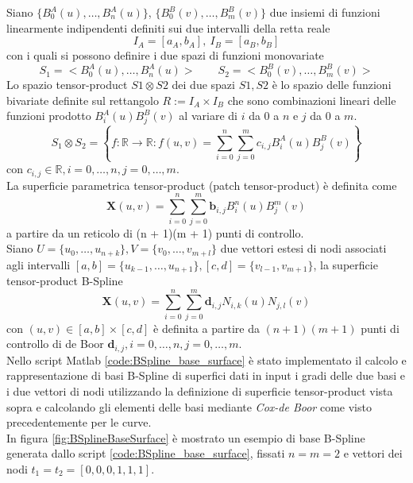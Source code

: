 \documentclass[a4paper, 12pt]{article}
\begin{document}
Siano $\{B^{A}_{0}(u), \dots, B^{A}_{n}(u) \}$, $\{ B^{B}_{0}(v), \dots, B^{B}_{m}(v) \}$
due insiemi di funzioni linearmente indipendenti definiti sui due intervalli della retta reale
$$ I_A = [a_A, b_A],\  I_B = [a_B, b_B]$$
con i quali si possono definire i due spazi di funzioni monovariate
$$S_1 = < B^{A}_{0}(u), \dots, B^{A}_{n}(u) > \qquad S_2 = < B^{B}_{0}(v), \dots, B^{B}_{m}(v) >$$
Lo spazio tensor-product
$S1 \otimes S2$
dei due spazi $S1, S2$ è lo spazio delle funzioni bivariate definite sul rettangolo
$R:= I_A \times I_B$
che sono combinazioni lineari delle funzioni prodotto
$B^{A}_{i}(u) B^{B}_{j}(v)$
al variare di $i$ da $0$ a $n$ e $j$ da $0$ a $m$.
$$S_1 \otimes S_2 = \left\{ f : \mathbb{R} \rightarrow \mathbb{R}: f(u, v) = \sum_{i = 0}^{n}\sum_{j = 0}^{m} c_{i,j}B^A_i(u)B^B_j(v) \right\}$$
con $c_{i,j} \in \mathbb{R}, i=0,\dots, n, j=0,\dots,m$.\\
La superficie parametrica tensor-product (patch tensor-product) è definita come
$$\mathbf{X}(u, v) = \sum_{i = 0}^{n} \sum_{j = 0}^{m} \mathbf{b}_{i, j} B^{n}_{i}(u)B_{j}^{m}(v) $$
a partire da un reticolo di (n + 1)(m + 1) punti di controllo.\\
Siano $U = \{u_0, \dots, u_{n+k}  \}, V = \{ v_0, \dots, v_{m+l}   \}$ due vettori estesi di nodi associati agli intervalli $[a,b] = \{u_{k-1}, \dots, u_{n+1}   \}, [c,d] = \{ v_{l-1}, v_{m+1}\}$, la superficie tensor-product B-Spline $$\mathbf{X}(u, v) = \sum_{i = 0}^{n} \sum_{j = 0}^{m} \mathbf{d}_{i, j} N_{i,k}(u)N_{j,l}(v) $$
con $(u,v) \in [a,b] \times [c,d]$ è definita a partire da $(n+1)(m+1) $ punti di controllo di de Boor $\mathbf{d}_{i,j}, i=0,\dots, n, j=0, \dots, m$.\\
Nello script Matlab \ref{code:BSpline_base_surface} è stato implementato il calcolo e rappresentazione di basi B-Spline di superfici dati in input i gradi delle due basi e i due vettori di nodi utilizzando la definizione di superficie tensor-product vista sopra e calcolando gli elementi delle basi mediante \textit{Cox-de Boor} come visto precedentemente per le curve.\\
In figura \ref{fig:BSplineBaseSurface} è mostrato un esempio di base B-Spline generata dallo script \ref{code:BSpline_base_surface}, fissati $n = m= 2$ e vettori dei nodi $t_1 = t_2 =[0, 0, 0, 1, 1, 1]$.
\end{document}
